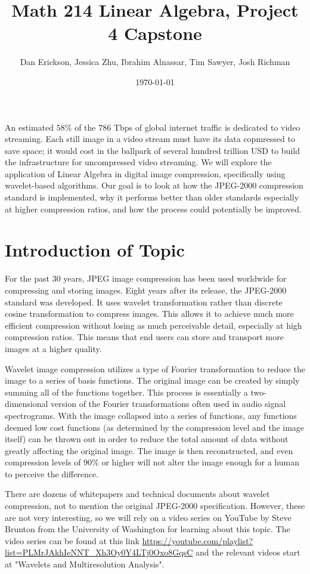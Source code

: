 \documentclass[12pt]{article}
\title{ Math 214 Linear Algebra, Project 4 Capstone }
\date{\today}
\author{Dan Erickson, Jessica Zhu, Ibrahim Alnassar, Tim Sawyer, Josh Richman}
\begin{document}
\maketitle

An estimated $ 58\% $ of the $786$ Tbps of global internet traffic is dedicated to video streaming. Each still image in a video stream must have its data copmressed to save space; it would cost in the ballpark of several hundred trillion USD to build the infrastructure for uncompressed video streaming. We will explore the application of Linear Algebra in digital image compression, specifically using wavelet-based algorithms. Our goal is to look at how the JPEG-2000 compression standard is implemented, why it performs better than older standards especially at higher compression ratios, and how the process could potentially be improved.

\section{Introduction of Topic}

For the past 30 years, JPEG image compression has been used worldwide for compressing and storing images. Eight years after its release, the JPEG-2000 standard was developed. It uses wavelet transformation rather than discrete cosine transformation to compress images. This allows it to achieve much more efficient compression without losing as much perceivable detail, especially at high compression ratios. This means that end users can store and transport more images at a higher quality.

Wavelet image compression utilizes a type of Fourier transformation to reduce the image to a series of basis functions. The original image can be created by simply summing all of the functions together. This process is essentially a two-dimensional version of the Fourier transformations often used in audio signal spectrograms. With the image collapsed into a series of functions, any functions deemed low cost functions (as determined by the compression level and the image itself) can be thrown out in order to reduce the total amount of data without greatly affecting the original image. The image is then reconstructed, and even compression levels of $ 90\% $ or higher will not alter the image enough for a human to perceive the difference.

There are dozens of whitepapers and technical documents about wavelet compression, not to mention the original JPEG-2000 specification. However, these are not very interesting, so we will rely on a video series on YouTube by Steve Brunton from the University of Washington for learning about this topic. The video series can be found at this link \url{https://youtube.com/playlist?list=PLMrJAkhIeNNT_Xh3Oy0Y4LTj0Oxo8GqsC} and the relevant videos start at "Wavelets and Multiresolution Analysis".
\end{document}
